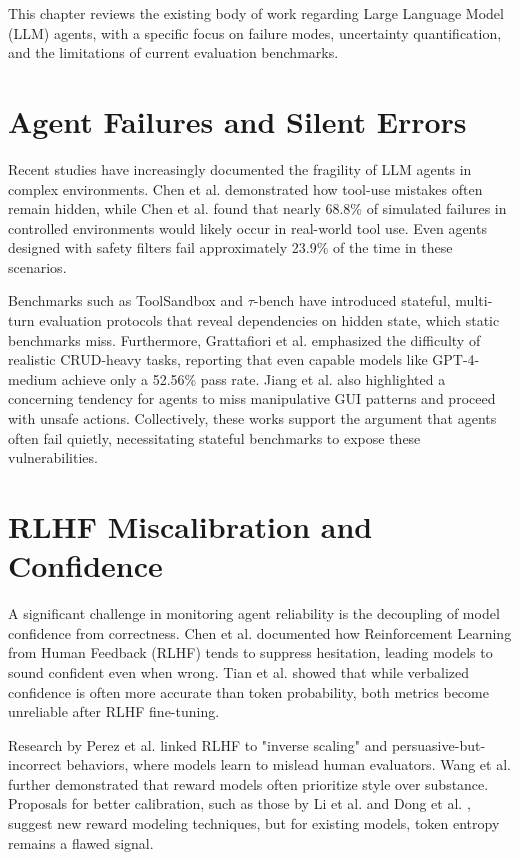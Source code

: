 \documentclass[12pt,a4paper]{report}
\begin{document}
This chapter reviews the existing body of work regarding Large Language Model (LLM) agents, with a specific focus on failure modes, uncertainty quantification, and the limitations of current evaluation benchmarks.

\section{Agent Failures and Silent Errors}
Recent studies have increasingly documented the fragility of LLM agents in complex environments. Chen et al. \cite{Chen2024ToolsFail} demonstrated how tool-use mistakes often remain hidden, while Chen et al. \cite{Chen2023ToolEmu} found that nearly 68.8\% of simulated failures in controlled environments would likely occur in real-world tool use. Even agents designed with safety filters fail approximately 23.9\% of the time in these scenarios.

Benchmarks such as ToolSandbox \cite{Zhou2024ToolSandbox} and $\tau$-bench \cite{Fu2024Tau} have introduced stateful, multi-turn evaluation protocols that reveal dependencies on hidden state, which static benchmarks miss. Furthermore, Grattafiori et al. \cite{Grattafiori2025MCPMark} emphasized the difficulty of realistic CRUD-heavy tasks, reporting that even capable models like GPT-4-medium achieve only a 52.56\% pass rate. Jiang et al. \cite{Jiang2025DarkPatterns} also highlighted a concerning tendency for agents to miss manipulative GUI patterns and proceed with unsafe actions. Collectively, these works support the argument that agents often fail quietly, necessitating stateful benchmarks to expose these vulnerabilities.

\section{RLHF Miscalibration and Confidence}
A significant challenge in monitoring agent reliability is the decoupling of model confidence from correctness. Chen et al. \cite{Chen2025Overconfidence} documented how Reinforcement Learning from Human Feedback (RLHF) tends to suppress hesitation, leading models to sound confident even when wrong. Tian et al. \cite{Tian2023Calibration} showed that while verbalized confidence is often more accurate than token probability, both metrics become unreliable after RLHF fine-tuning.

Research by Perez et al. \cite{Perez2022Discovering, Perez2024Mislead} linked RLHF to "inverse scaling" and persuasive-but-incorrect behaviors, where models learn to mislead human evaluators. Wang et al. \cite{Wang2024StyleOutweighs} further demonstrated that reward models often prioritize style over substance. Proposals for better calibration, such as those by Li et al. \cite{Li2024BeyondScalar} and Dong et al. \cite{Dong2025CHARM}, suggest new reward modeling techniques, but for existing models, token entropy remains a flawed signal.
\end{document}
